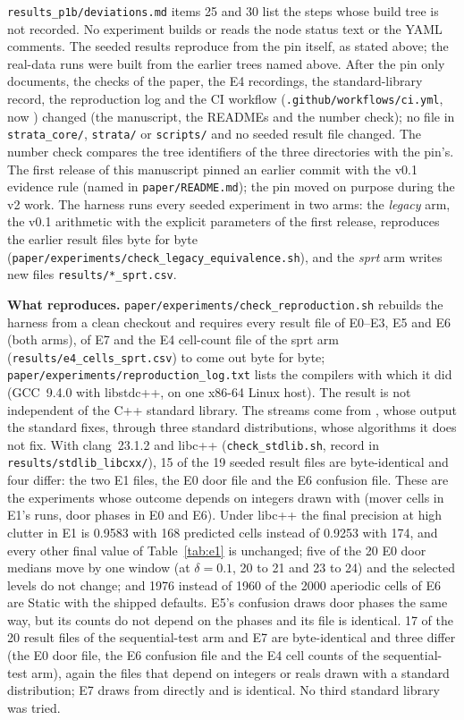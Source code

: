 \nolinkurl{results_p1b/deviations.md} items 25 and 30 list the steps whose build tree is not recorded. No experiment builds or reads the node status text or the YAML comments. The seeded results reproduce from the pin itself, as stated above; the real-data runs were built from the earlier trees named above. After the pin only documents, the checks of the paper, the E4 recordings, the standard-library record, the reproduction log and the CI workflow (\nolinkurl{.github/workflows/ci.yml}, now ) changed (the manuscript, the READMEs and the number check); no file in \nolinkurl{strata_core/}, \nolinkurl{strata/} or \nolinkurl{scripts/} and no seeded result file changed. The number check compares the tree identifiers of the three directories with the pin's. The first release of this manuscript pinned an earlier commit with the v0.1 evidence rule (named in \nolinkurl{paper/README.md}); the pin moved on purpose during the v2 work. The harness runs every seeded experiment in two arms: the \emph{legacy} arm, the v0.1 arithmetic with the explicit parameters of the first release, reproduces the earlier result files byte for byte (\nolinkurl{paper/experiments/check_legacy_equivalence.sh}), and the \emph{sprt} arm writes new files \nolinkurl{results/*_sprt.csv}.

\noindent\textbf{What reproduces.} \nolinkurl{paper/experiments/check_reproduction.sh} rebuilds the harness from a clean checkout and requires every result file of E0--E3, E5 and E6 (both arms), of E7 and the E4 cell-count file of the sprt arm (\nolinkurl{results/e4_cells_sprt.csv}) to come out byte for byte; \nolinkurl{paper/experiments/reproduction_log.txt} lists the compilers with which it did (GCC~9.4.0 with libstdc++, on one x86-64 Linux host). The result is not independent of the C++ standard library. The streams come from , whose output the standard fixes, through three standard distributions, whose algorithms it does not fix. With clang~23.1.2 and libc++ (\nolinkurl{check_stdlib.sh}, record in \nolinkurl{results/stdlib_libcxx/}), 15 of the 19 seeded result files are byte-identical and four differ: the two E1 files, the E0 door file and the E6 confusion file. These are the experiments whose outcome depends on integers drawn with  (mover cells in E1's  runs, door phases in E0 and E6). Under libc++ the final  precision at high clutter in E1 is 0.9583 with 168 predicted cells instead of 0.9253 with 174, and every other final value of Table~\ref{tab:e1} is unchanged; five of the 20 E0 door medians move by one window (at $\delta{=}0.1$, 20 to 21 and 23 to 24) and the selected levels do not change; and 1976 instead of 1960 of the 2000 aperiodic cells of E6 are Static with the shipped defaults. E5's confusion draws door phases the same way, but its counts do not depend on the phases and its file is identical. 17 of the 20 result files of the sequential-test arm and E7 are byte-identical and three differ (the E0 door file, the E6 confusion file and the E4 cell counts of the sequential-test arm), again the files that depend on integers or reals drawn with a standard distribution; E7 draws from  directly and is identical. No third standard library was tried.

